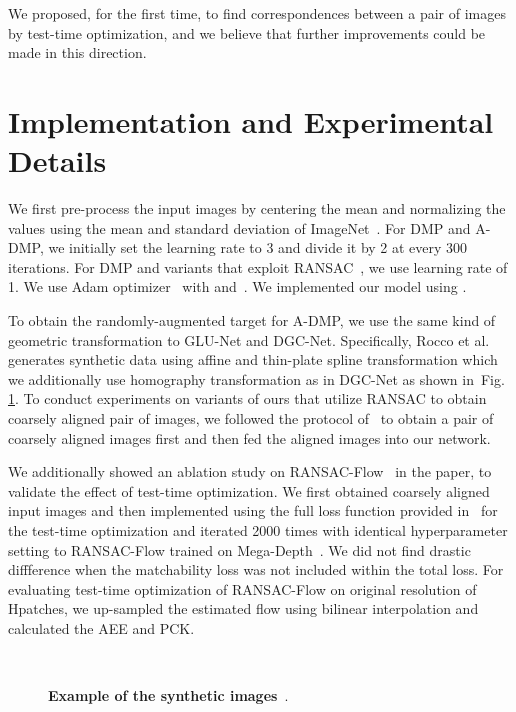 \documentclass[10pt,twocolumn,letterpaper]{article}
\newcommand{\figref}[1]{Fig. \ref{#1}}
\begin{document}
We proposed, for the first time, to find correspondences between a pair of images by test-time optimization, and we believe that further improvements could be made in this direction. 

\section{Implementation and Experimental Details}\label{sec:3}
We first pre-process the input images by centering the mean and normalizing the values using the mean and standard deviation of ImageNet~\cite{deng2009imagenet}. For DMP and A-DMP, we initially set the learning rate to 3 and divide it by 2 at every 300 iterations. For DMP and variants that exploit RANSAC~\cite{shen2020ransac}, we use learning rate of 1. We use Adam optimizer~\cite{kingma2014adam} with  and~. We implemented our model using \cite{paszke2017automatic}. 

To obtain the randomly-augmented target for A-DMP, we use the same kind of geometric transformation to GLU-Net and DGC-Net. 
Specifically, Rocco et al.~\cite{rocco2017convolutional} generates synthetic data using affine and thin-plate spline transformation which we additionally use homography transformation as in DGC-Net as shown in~\figref{synth}. To conduct experiments on variants of ours that utilize RANSAC to obtain coarsely aligned pair of images, we followed the protocol of~\cite{shen2020ransac} to obtain a pair of coarsely aligned images first and then fed the aligned images into our network.

We additionally showed an ablation study on RANSAC-Flow~\cite{shen2020ransac} in the paper, to validate the effect of test-time optimization. We first obtained coarsely aligned input images and then implemented using the full loss function provided in~\cite{shen2020ransac} for the test-time optimization and iterated 2000 times with identical hyperparameter setting to RANSAC-Flow trained on Mega-Depth~\cite{li2018megadepth}. We did not find drastic diffference when the matchability loss was not included within the total loss. For evaluating test-time optimization of RANSAC-Flow on original resolution of Hpatches, we up-sampled the estimated flow using bilinear interpolation and calculated the AEE and PCK. 
\begin{figure}[t]
	\centering
	\renewcommand{\thesubfigure}{}
	\hfill
	\hfill
	\hfill
	\hfill\\
	\caption{\textbf{Example of the synthetic images}~\cite{rocco2017convolutional}.\label{synth} }\vspace{-10pt}
\end{figure}
\end{document}
